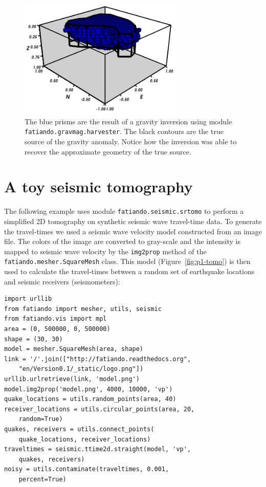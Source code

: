 \begin{figure}
    \centering
    \includegraphics[width=0.7\textwidth]{figures/paper-fatiando/gravmag_harvester}
    \caption{
        The blue prisms are the result of a gravity inversion using module
        \texttt{fatiando.gravmag.harvester}. The black contours are the true
        source of the gravity anomaly. Notice how the inversion was able to
        recover the approximate geometry of the true source.
    }
    \label{fig:p1-harvester}
\end{figure}




\section{A toy seismic tomography}

The following example uses module \texttt{fatiando.seismic.srtomo} to
perform a simplified 2D tomography on synthetic seismic wave travel-time
data. To generate the travel-times we used a seismic wave velocity model
constructed from an image file. The colors of the image are converted to
gray-scale and the intensity is mapped to seismic wave velocity by the
\texttt{img2prop} method of the \texttt{fatiando.mesher.SquareMesh}
class. This model (Figure~\ref{fig:p1-tomo}) is then used to calculate the
travel-times between a random set of earthquake locations and seismic
receivers (seismometers):

\begin{verbatim}
import urllib
from fatiando import mesher, utils, seismic
from fatiando.vis import mpl
area = (0, 500000, 0, 500000)
shape = (30, 30)
model = mesher.SquareMesh(area, shape)
link = '/'.join(["http://fatiando.readthedocs.org",
    "en/Version0.1/_static/logo.png"])
urllib.urlretrieve(link, 'model.png')
model.img2prop('model.png', 4000, 10000, 'vp')
quake_locations = utils.random_points(area, 40)
receiver_locations = utils.circular_points(area, 20,
    random=True)
quakes, receivers = utils.connect_points(
    quake_locations, receiver_locations)
traveltimes = seismic.ttime2d.straight(model, 'vp',
    quakes, receivers)
noisy = utils.contaminate(traveltimes, 0.001,
    percent=True)
\end{verbatim}

